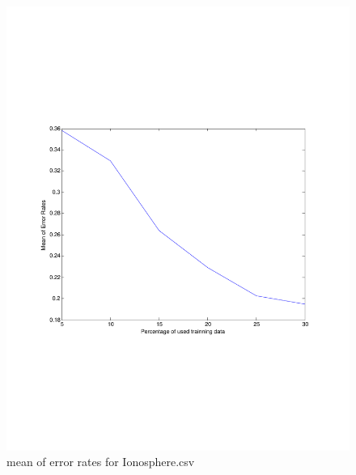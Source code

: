 \documentclass[12pt]{amsart}
\begin{document}
\begin{figure}[H]
\centering
        \includegraphics[totalheight=18cm]{Iono_mean_logReg.pdf}
    \caption{mean of error rates for Ionosphere.csv}
    \label{fig:verticalcell3}
\end{figure}
\end{document}
